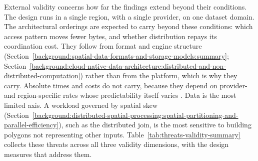External validity concerns how far the findings extend beyond their conditions. The design runs in a single region, with a single provider, on one dataset domain. The architectural orderings are expected to carry beyond these conditions: which access pattern moves fewer bytes, and whether distribution repays its coordination cost. They follow from format and engine structure (Section~\ref{background:spatial-data-formats-and-storage-models:summary}; Section~\ref{background:cloud-native-data-architecture:distributed-and-non-distributed-computation}) rather than from the platform, which is why they carry. Absolute times and costs do not carry, because they depend on provider- and region-specific rates whose predictability itself varies \parencite{leitner2016_patterns_chaos_iaas}. Data is the most limited axis. A workload governed by spatial skew (Section~\ref{background:distributed-spatial-processing:spatial-partitioning-and-parallel-efficiency}), such as the distributed join, is the most sensitive to building polygons not representing other inputs. Table~\ref{tab:threats-validity-summary} collects these threats across all three validity dimensions, with the design measures that address them.

